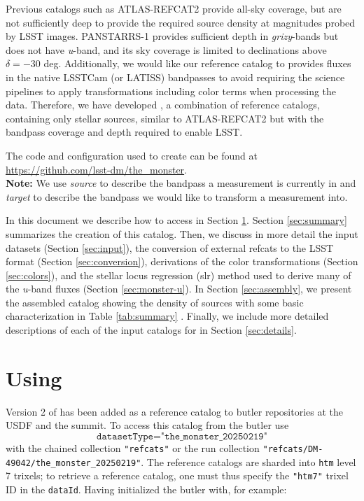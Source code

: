 Previous catalogs such as ATLAS-REFCAT2 \citep{Tonry:2018} provide all-sky coverage, but are not sufficiently deep to provide the required source density at magnitudes probed by LSST images.
PANSTARRS-1\citep[PS1;][]{Chambers:2016} provides sufficient depth in \emph{grizy}-bands but does not have \emph{u}-band, and its sky coverage is limited to declinations above $\delta = -30$ deg.
Additionally, we would like our reference catalog to provides fluxes in the native LSSTCam (or LATISS) bandpasses to avoid requiring the science pipelines to apply transformations including color terms when processing the data.
Therefore, we have developed \monster, a combination of reference catalogs, containing only stellar sources, similar to ATLAS-REFCAT2 but with the bandpass coverage and depth required to enable LSST.

The code and configuration used to create \monster can be found at \url{https://github.com/lsst-dm/the_monster}.\\

\textbf{Note:} We use \emph{source} to describe the bandpass a measurement is currently in and \emph{target} to describe the bandpass we would like to transform a measurement into.

In this document we describe how to access \monster in Section \ref{sec:using}. Section \ref{sec:summary} summarizes the creation of this catalog. 
Then, we discuss in more detail the input datasets (Section \ref{sec:input}), the conversion of external refcats to the LSST format (Section \ref{sec:conversion}), derivations of the color transformations (Section \ref{sec:colors}), and the stellar locus regression (slr) method used to derive many of the \emph{u}-band fluxes (Section \ref{sec:monster-u}).
In Section \ref{sec:assembly}, we present the assembled catalog showing the density of sources with some basic characterization in Table \ref{tab:summary} .
Finally, we include more detailed descriptions of each of the input catalogs for \monster in Section \ref{sec:details}.

\section{Using \monster}
\label{sec:using}
Version 2 of \monster has been added as a reference catalog to butler repositories at the USDF and the summit.
To access this catalog from the butler use
$$\texttt{datasetType="the\_monster\_20250219"}$$
with the chained collection \texttt{"refcats"} or the run collection \texttt{"refcats/DM-49042/the\_monster\_20250219"}.
The reference catalogs are sharded into \texttt{htm} level 7 trixels; to retrieve a reference catalog, one must thus specify the \texttt{"htm7"} trixel ID in the \texttt{dataId}. Having initialized the butler with, for example:

